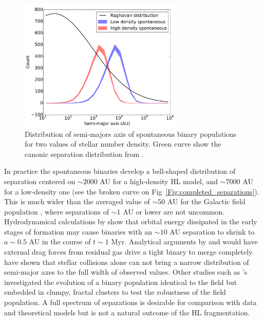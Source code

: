 \begin{figure}
\begin{center}
\includegraphics[width=0.7\textwidth]{Figures/5_spontaneous_smaxis}
\caption{Distribution of semi-majors axis of spontaneous binary populations for two values of stellar number density. Green curve show the canonic separation distribution from \protect\cite{Raghavan2010}. }
\label{Fig:5_spontaneous_smaxis}
\end{center}
\end{figure}


In practice the spontaneous binaries develop a bell-shaped  distribution of separation centered on $\sim 2000$ AU for a high-density HL model,  and $\sim 7000$ AU for a low-density one (see the broken curve on Fig~\ref{Fig:completed_separations}). This is much wider than the averaged value of $\sim 50$ AU for the Galactic field population \citep{DM91,raghavan2010}, where separations of $\sim 1 $ AU or lower are not uncommon. Hydrodynamical calculations by \cite{bate2012} show that orbital energy dissipated in the early stages of formation may cause binaries with an $\sim 10 $ AU  separation to shrink to $ a \sim  0.5 $ AU in the course of $t \sim 1 $ Myr. Analytical arguments by \cite{stahler2010} and \cite{korntreff2012} would have external drag forces from residual gas drive a tight binary to merge completely. \cite{kroupaburkert2001} have shown that stellar collisions  alone can not bring a narrow distribution of semi-major axes to the full width of observed values. Other studies such as \cite{parker2014}'s investigated the evolution of a binary population identical to the field but embedded in clumpy, fractal clusters \citep{goodwin2004} to test the robustness of the field population. 
A full spectrum of separations is desirable for comparison with data and theoretical models but is not a  natural outcome of the HL fragmentation. 

